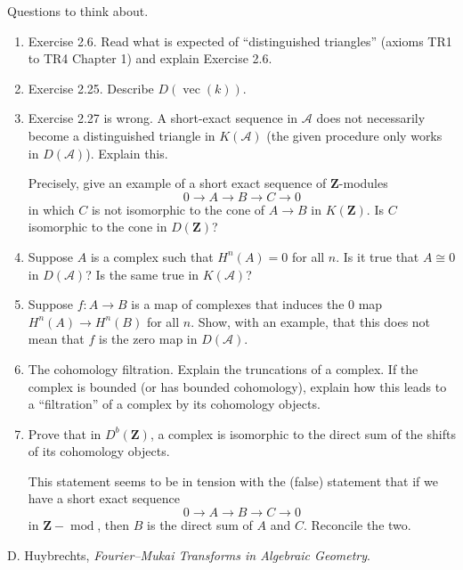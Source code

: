 \documentclass{amsart}
\begin{document}
Questions to think about.
\begin{enumerate}
\item Exercise 2.6. Read what is expected of ``distinguished triangles'' (axioms TR1 to TR4 Chapter 1) and explain Exercise 2.6.
\item Exercise 2.25.  Describe \(D(\operatorname{vec} (k))\).

\item Exercise 2.27 is wrong.  A short-exact sequence in \(\mathcal{A}\) does not necessarily become a distinguished triangle in \(K(\mathcal{A})\) (the given procedure only works in \(D(\mathcal{A})\)).  Explain this.

  Precisely, give an example of a short exact sequence of \(\mathbf{Z}\)-modules
  \[ 0 \to A \to B \to C \to 0\]
  in which \(C\) is not isomorphic to the cone of \(A \to B\) in \(K(\mathbf{Z})\).
  Is \(C\) isomorphic to the cone in \(D(\mathbf{Z})\)?

\item Suppose \(A\) is a complex such that \(H^n(A) = 0\) for all \(n\).
  Is it true that \(A \cong 0\) in \(D(\mathcal{A})\)?
  Is the same true in \(K(\mathcal{A})\)?

\item Suppose \(f \colon A \to B\) is a  map of complexes that induces the \(0\) map \(H^n(A) \to H^n(B)\) for all \(n\).
  Show, with an example, that this does not mean that \(f\) is the zero map in \(D(\mathcal{A})\).

\item The cohomology filtration.
  Explain the truncations of a complex.
  If the complex is bounded (or has bounded cohomology), explain how this leads to a ``filtration'' of a complex by its cohomology objects.

\item Prove that in \(D^b(\mathbf{Z})\), a complex is isomorphic to the direct sum of the shifts of its cohomology objects.

  This statement seems to be in tension with the (false) statement that if we have a short exact sequence
\[ 0 \to A \to B \to C \to 0\]
in \(\mathbf{Z}-\operatorname{mod}\), then \(B\) is the direct sum of \(A\) and \(C\).
Reconcile the two.
  
\end{enumerate}



\begin{thebibliography}{1}
   D. Huybrechts, \emph{Fourier--Mukai Transforms in Algebraic Geometry}.
\end{thebibliography}
\end{document}

